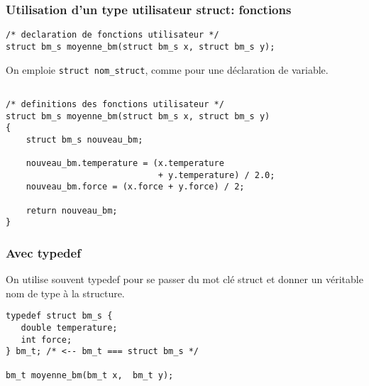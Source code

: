 \documentclass[xcolor=pdftex,svgnames,table]{beamer}
\begin{document}
\begin{frame}[fragile]
  \frametitle{Utilisation d'un type utilisateur struct: fonctions}

\begin{lstlisting}[escapechar={\%},basicstyle=\ttfamily\small] 
/* declaration de fonctions utilisateur */
struct bm_s moyenne_bm(struct bm_s x, struct bm_s y);
\end{lstlisting}
\pause
On emploie \verb|struct nom_struct|, comme pour une déclaration de variable.
\begin{lstlisting}[escapechar={\%},basicstyle=\ttfamily\small] 

/* definitions des fonctions utilisateur */
struct bm_s moyenne_bm(struct bm_s x, struct bm_s y)
{
    struct bm_s nouveau_bm;

    nouveau_bm.temperature = (x.temperature 
                              + y.temperature) / 2.0;
    nouveau_bm.force = (x.force + y.force) / 2;

    return nouveau_bm;
}
\end{lstlisting}
\end{frame}

\begin{frame}[fragile]
  \frametitle{Avec typedef}
  On utilise souvent \alert{typedef} pour se passer du mot clé struct et
  donner un véritable nom de type à la structure.

\begin{lstlisting}
typedef struct bm_s {
   double temperature;
   int force;
} bm_t; /* <-- bm_t === struct bm_s */

bm_t moyenne_bm(bm_t x,  bm_t y);
\end{lstlisting}
\end{frame}
\end{document}
